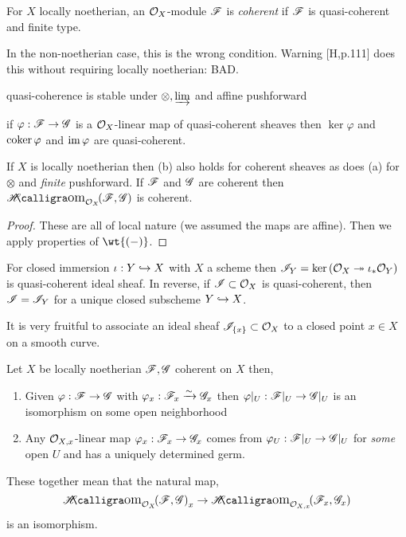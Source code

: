 \documentclass[12pt]{article}
\begin{document}
\begin{defn}
For $X$ locally noetherian, an $\mathcal{O}_{X}$-module $\mathscr{F}$ is \textit{coherent} if $\mathscr{F}$ is quasi-coherent and finite type.
\end{defn}

\begin{rmk}
In the non-noetherian case, this is the wrong condition. Warning [H,p.111] does this without requiring locally noetherian: BAD.
\end{rmk}

\begin{thm}
\item quasi-coherence is stable under $\otimes, \varinjlim$ and affine pushforward
\item if $\varphi : \mathscr{F} \to \mathscr{G}$ is a $\mathcal{O}_{X}$-linear map of quasi-coherent sheaves then $\ker{\varphi}$ and $\operatorname{\mathrm{coker}}{\varphi}$ and $\operatorname{\mathrm{im}}{\varphi}$ are quasi-coherent.
\item If $X$ is locally noetherian then (b) also holds for coherent sheaves as does (a) for $\otimes$ and \textit{finite} pushforward. If $\mathscr{F}$ and $\mathscr{G}$ are coherent then $\shHom{\struct{X}}{\F}{\G}$ is coherent. 
\end{thm}

\begin{proof}
These are all of local nature (we assumed the maps are affine). Then we apply properties of $\wt{(-)}$. 
\end{proof}

\begin{example}
For closed immersion $\iota : Y \hookrightarrow X$ with $X$ a scheme then $\mathscr{I}_Y = \ker{(\mathcal{O}_{X} \twoheadrightarrow\iota_* \mathcal{O}_{Y})}$ is quasi-coherent ideal sheaf. In reverse, if $\mathscr{I} \subset \mathcal{O}_{X}$ is quasi-coherent, then $\mathscr{I} = \mathscr{I}_Y$ for a unique closed subscheme $Y \hookrightarrow X$. 
\end{example}

\begin{rmk}
It is very fruitful to associate an ideal sheaf $\mathscr{I}_{\{x\}} \subset \mathcal{O}_{X}$ to a closed point $x \in X$ on a smooth curve.
\end{rmk}

\begin{prop}
Let $X$ be locally noetherian $\mathscr{F}, \mathscr{G}$ coherent on $X$ then,
\begin{enumerate}
\item Given $\varphi : \mathscr{F} \to \mathscr{G}$ with $\varphi_x : \mathscr{F}_x \xrightarrow{\sim} \mathscr{G}_x$ then $\varphi|_U : \mathscr{F}|_U \to \mathscr{G}|_U$ is an isomorphism on some open neighborhood
\item Any $\mathcal{O}_{X, x}$-linear map $\varphi_x  : \mathscr{F}_x \to \mathscr{G}_x$ comes from $\varphi_U : \mathscr{F}|_U \to \mathscr{G}|_U$ for \textit{some} open $U$ and has a uniquely determined germ.
\end{enumerate}
These together mean that the natural map,
\[ \shHom{\struct{X}}{\F}{\G}_x \to \shHom{\stalk{X}{x}}{\F_x}{\G_x} \]
is an isomorphism.
\end{prop}
\end{document}
